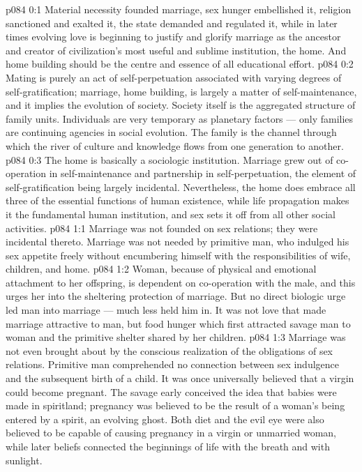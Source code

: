 \author{Chief of Seraphim}
\vs p084 0:1 Material necessity founded marriage, sex hunger embellished it, religion sanctioned and exalted it, the state demanded and regulated it, while in later times evolving love is beginning to justify and glorify marriage as the ancestor and creator of civilization’s most useful and sublime institution, the home. And home building should be the centre and essence of all educational effort.
\vs p084 0:2 Mating is purely an act of self\hyp{}perpetuation associated with varying degrees of self\hyp{}gratification; marriage, home building, is largely a matter of self\hyp{}maintenance, and it implies the evolution of society. Society itself is the aggregated structure of family units. Individuals are very temporary as planetary factors --- only families are continuing agencies in social evolution. The family is the channel through which the river of culture and knowledge flows from one generation to another.
\vs p084 0:3 The home is basically a sociologic institution. Marriage grew out of co\hyp{}operation in self\hyp{}maintenance and partnership in self\hyp{}perpetuation, the element of self\hyp{}gratification being largely incidental. Nevertheless, the home does embrace all three of the essential functions of human existence, while life propagation makes it the fundamental human institution, and sex sets it off from all other social activities.
\vs p084 1:1 Marriage was not founded on sex relations; they were incidental thereto. Marriage was not needed by primitive man, who indulged his sex appetite freely without encumbering himself with the responsibilities of wife, children, and home.
\vs p084 1:2 Woman, because of physical and emotional attachment to her offspring, is dependent on co\hyp{}operation with the male, and this urges her into the sheltering protection of marriage. But no direct biologic urge led man into marriage --- much less held him in. It was not love that made marriage attractive to man, but food hunger which first attracted savage man to woman and the primitive shelter shared by her children.
\vs p084 1:3 \pc Marriage was not even brought about by the conscious realization of the obligations of sex relations. Primitive man comprehended no connection between sex indulgence and the subsequent birth of a child. It was once universally believed that a virgin could become pregnant. The savage early conceived the idea that babies were made in spiritland; pregnancy was believed to be the result of a woman’s being entered by a spirit, an evolving ghost. Both diet and the evil eye were also believed to be capable of causing pregnancy in a virgin or unmarried woman, while later beliefs connected the beginnings of life with the breath and with sunlight.

